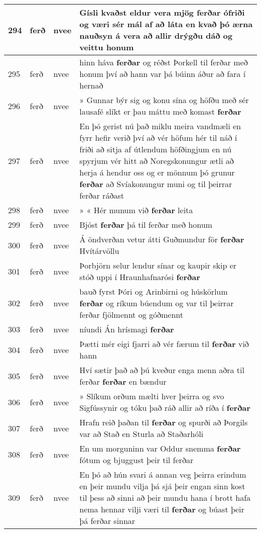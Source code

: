 \documentclass{article}
\begin{document}
\begin{longtable}{p{1cm}|p{1cm}|p{1cm}|p{13cm}}
\hline
294&ferð&nvee&Gísli kvaðst eldur vera mjög \textbf{ferðar} ófriði og væri sér mál af að láta en kvað þó ærna nauðsyn á vera að allir drýgðu dáð og veittu honum\\
\hline
295&ferð&nvee&hinn háva \textbf{ferðar} og réðst Þorkell til ferðar með honum því að hann var þá búinn áður að fara í hernað\\
\hline
296&ferð&nvee&» Gunnar býr sig og konu sína og höfðu með sér lausafé slíkt er þau máttu með komast \textbf{ferðar} \\
\hline
297&ferð&nvee&En þó gerist nú það miklu meira vandmæli en fyrr hefir verið því að vér höfum hér til náð í friði að sitja af útlendum höfðingjum en nú spyrjum vér hitt að Noregskonungur ætli að herja á hendur oss og er mönnum þó grunur \textbf{ferðar} að Svíakonungur muni og til þeirrar ferðar ráðast\\
\hline
298&ferð&nvee&» « Hér munum við \textbf{ferðar} leita\\
\hline
299&ferð&nvee&Bjóst \textbf{ferðar} þá til ferðar með honum\\
\hline
300&ferð&nvee&Á öndverðan vetur átti Guðmundur för \textbf{ferðar} Hvítárvöllu\\
\hline
301&ferð&nvee&Þorbjörn selur lendur sínar og kaupir skip er stóð uppi í Hraunhafnarósi \textbf{ferðar} \\
\hline
302&ferð&nvee&bauð fyrst Þóri og Arinbirni og húskörlum \textbf{ferðar} og ríkum búendum og var til þeirrar ferðar fjölmennt og góðmennt\\
\hline
303&ferð&nvee&níundi Án hrísmagi \textbf{ferðar} \\
\hline
304&ferð&nvee&Þætti mér eigi fjarri að vér færum til \textbf{ferðar} við hann\\
\hline
305&ferð&nvee&Hví sætir það að þú kveður enga menn aðra til ferðar \textbf{ferðar} en bændur\\
\hline
306&ferð&nvee&» Slíkum orðum mælti hver þeirra og svo Sigfússynir og tóku það ráð allir að ríða í \textbf{ferðar} \\
\hline
307&ferð&nvee&Hrafn reið þaðan til \textbf{ferðar} og spurði að Þorgils var að Stað en Sturla að Staðarhóli\\
\hline
308&ferð&nvee&En um morguninn var Oddur snemma \textbf{ferðar} fótum og bjuggust þeir til ferðar\\
\hline
309&ferð&nvee&En þó að hún svari á annan veg þeirra erindum en þeir mundu vilja þá sjá þeir engan sinn kost til þess að sinni að þeir mundu hana í brott hafa nema hennar vilji væri til \textbf{ferðar} og búast þeir þá ferðar sinnar\\

\end{longtable}
\end{document}
